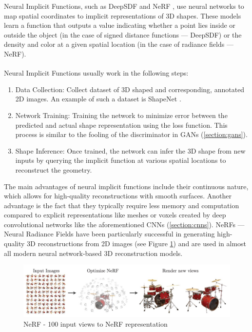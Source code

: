 Neural Implicit Functions, such as DeepSDF \autocite{park_deepsdf_2019} and NeRF \autocite{mildenhall_nerf_2021}, use neural networks to map spatial coordinates to implicit representations of 3D shapes. These models learn a function that outputs a value indicating whether a point lies inside or outside the object (in the case of signed distance functions — DeepSDF) or the density and color at a given spatial location (in the case of radiance fields — NeRF).

\paragraph{}
Neural Implicit Functions usually work in the following steps:
\begin{enumerate}
    \item Data Collection: Collect dataset of 3D shaped and corresponding, annotated 2D images. An example of such a dataset is ShapeNet \autocite{chang_shapenet_2015}.
    \item Network Training: Training the network to minimize error between the predicted and actual shape representation using the loss function. This process is similar to the fooling of the discriminator in GANs (\ref{section:gans}).
    \item Shape Inference: Once trained, the network can infer the 3D shape from new inputs by querying the implicit function at various spatial locations to reconstruct the geometry.
\end{enumerate}

The main advantages of neural implicit functions include their continuous nature, which allows for high-quality reconstructions with smooth surfaces. Another advantage is the fact that they typically require less memory and computation compared to explicit representations like meshes or voxels created by deep convolutional networks like the aforementioned CNNs (\ref{section:cnns}).
NeRFs — Neural Radiance Fields \autocite{mildenhall_nerf_2021} have been particularly successful in generating high-quality 3D reconstructions from 2D images (see Figure \ref{fig:nerf}) and are used in almost all modern neural network-based 3D reconstruction models.


\begin{figure}
    \centering
    \includegraphics[width=1\linewidth]{images/nerf.jpg}
    \caption{NeRF - 100 input views to NeRF representation  \autocite{mildenhall_nerf_2021}}
    \label{fig:nerf}
\end{figure}

